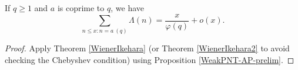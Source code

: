 \begin{theorem}[WeakPNT-AP]
\label{WeakPNT-AP}
\leanok
If $q ≥ 1$ and $a$ is coprime to $q$, we have
  $$ \sum_{n \leq x: n = a\ (q)} \Lambda(n) = \frac{x}{\varphi(q)} + o(x).$$
\end{theorem}
\begin{proof}
\leanok
Apply Theorem \ref{WienerIkehara} (or Theorem \ref{WienerIkehara2} to avoid
  checking the Chebyshev condition) using Proposition \ref{WeakPNT-AP-prelim}.
\end{proof}
